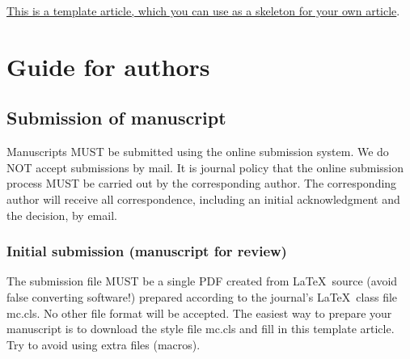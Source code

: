 \documentclass{mc}
\begin{document}
\underline{This is a template article, which you can use as a skeleton for your own article}.



\section{Guide for authors}

\subsection{Submission of manuscript}

Manuscripts MUST be submitted using the online submission system. We do NOT accept submissions by mail.
It is journal policy that the online submission process MUST be carried out by the corresponding author.
The corresponding author will receive all correspondence, including an initial acknowledgment and the decision, by email.

\subsubsection{Initial submission (manuscript for review)}

The submission file MUST be a single PDF created from \LaTeX\ source (avoid false converting software!) prepared according to the journal's \LaTeX\ class file mc.cls. No other file format will be accepted. The easiest way to prepare your manuscript is to download the style file mc.cls and fill in this  template article. Try to avoid using extra files (macros).
\end{document}
